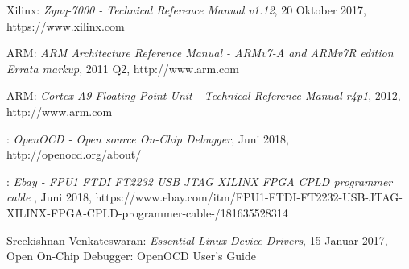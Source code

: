 \begingroup
\renewcommand{\chapter}[2]{\section#1{#2}}%
\begin{thebibliography}{99}




	Xilinx:
	\emph{Zynq-7000 - Technical Reference Manual v1.12},
	20 Oktober 2017, https://www.xilinx.com

	ARM:
	\emph{ARM Architecture Reference Manual - ARMv7-A and ARMv7R edition Errata markup},
	2011 Q2, http://www.arm.com

	ARM:
	\emph{Cortex-A9 Floating-Point Unit - Technical Reference Manual r4p1},
	2012, http://www.arm.com

	:
	\emph{OpenOCD - Open source On-Chip Debugger},
	Juni 2018, http://openocd.org/about/

	:
	\emph{Ebay - FPU1 FTDI FT2232 USB JTAG XILINX FPGA CPLD programmer cable },
	Juni 2018, https://www.ebay.com/itm/FPU1-FTDI-FT2232-USB-JTAG-XILINX-FPGA-CPLD-programmer-cable-/181635528314
	
	Sreekishnan Venkateswaran:
	\emph{Essential Linux Device Drivers},
	15 Januar 2017, Open On-Chip Debugger: OpenOCD User's Guide









	\end{thebibliography}
\endgroup
